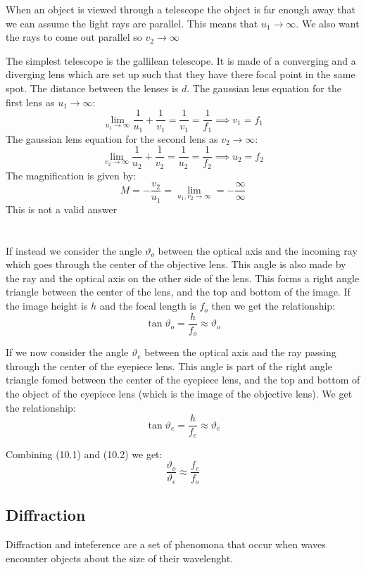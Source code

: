 When an object is viewed through a telescope the object is far enough away that we can assume the light rays are parallel. This means that \(u_1\to\infty\). We also want the rays to come out parallel so \(v_2\to\infty\)

The simplest telescope is the gallilean telescope. It is made of a converging and a diverging lens which are set up such that they have there focal point in the same spot. The distance between the lenses is \(d\).
The gaussian lens equation for the first lens as \(u_1\to\infty\):
\[\lim_{u_1\to\infty}\frac{1}{u_1}+\frac{1}{v_1}=\frac{1}{v_1}=\frac{1}{f_1}\implies v_1=f_1\]
The gaussian lens equation for the second lens as \(v_2\to\infty\):
\[\lim_{v_2\to\infty}\frac{1}{u_2}+\frac{1}{v_2}=\frac{1}{u_2}=\frac{1}{f_2}\implies u_2=f_2\]
The magnification is given by:
\[M=-\frac{v_2}{u_1}=\lim_{u_1,v_2\to\infty}=-\frac{\infty}{\infty}\]
This is not a valid answer \Sadey[1.25]


\section{}
If instead we consider the angle \(\vartheta_o\) between the optical axis and the incoming ray which goes through the center of the objective lens. This angle is also made by the ray and the optical axis on the other side of the lens. This forms a right angle triangle between the center of the lens, and the top and bottom of the image. If the image height is \(h\) and the focal length is \(f_o\) then we get the relationship:
\[\tan\vartheta_o=\frac{h}{f_o}\approx\vartheta_o\tag{10.1}\]

If we now consider the angle \(\vartheta_e\) between the optical axis and the ray passing through the center of the eyepiece lens. This angle is part of the right angle triangle fomed between the center of the eyepiece lens, and the top and bottom of the object of the eyepiece lens (which is the image of the objective lens). We get the relationship:
\[\tan\vartheta_e=\frac{h}{f_e}\approx\vartheta_e\tag{10.2}\]

Combining (10.1) and (10.2) we get:
\[\frac{\vartheta_o}{\vartheta_e}\approx\frac{f_e}{f_o}\]

\subsection*{Diffraction}

Diffraction and inteference are a set of phenomona that occur when waves encounter objects about the size of their wavelenght.

